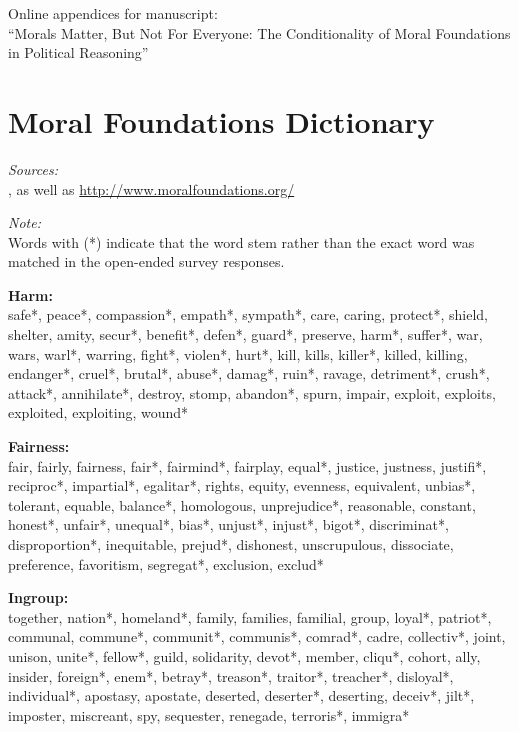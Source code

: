 \documentclass[12pt]{article}
\begin{document}
\clearpage\footnotesize\singlespacing
\setcounter{page}{1}
\appendices
\appendixpage
\renewcommand\thesubsection{\Roman{subsection}}
\begin{flushleft}
Online appendices for manuscript: \\
``Morals Matter, But Not For Everyone: The Conditionality of Moral Foundations in Political Reasoning''

\startcontents[sections]
\clearpage

\section{Moral Foundations Dictionary}\label{app:dict}
\textit{Sources:}\\
\citet{graham2009liberals}, as well as \url{http://www.moralfoundations.org/}
\vspace{.5cm}

\textit{Note:}\\
Words with (*) indicate that the word stem rather than the exact word was matched in the open-ended survey responses.
\vspace{.5cm}

\textbf{Harm:}\\
safe*, peace*, compassion*, empath*, sympath*, care, caring, protect*, shield, shelter, amity, secur*, benefit*, defen*, guard*, preserve, harm*, suffer*, war, wars, warl*, warring, fight*, violen*, hurt*, kill, kills, killer*, killed, killing, endanger*, cruel*, brutal*, abuse*, damag*, ruin*, ravage, detriment*, crush*, attack*, annihilate*, destroy, stomp, abandon*, spurn, impair, exploit, exploits, exploited, exploiting, wound*
\vspace{.5cm}

\textbf{Fairness:}\\
fair, fairly, fairness, fair*, fairmind*, fairplay, equal*, justice, justness, justifi*, reciproc*, impartial*, egalitar*, rights, equity, evenness, equivalent, unbias*, tolerant, equable, balance*, homologous, unprejudice*, reasonable, constant, honest*, unfair*, unequal*, bias*, unjust*, injust*, bigot*, discriminat*, disproportion*, inequitable, prejud*, dishonest, unscrupulous, dissociate, preference, favoritism, segregat*, exclusion, exclud*
\vspace{.5cm}

\textbf{Ingroup:}\\
together, nation*, homeland*, family, families, familial, group, loyal*, patriot*, communal, commune*, communit*, communis*, comrad*, cadre, collectiv*, joint, unison, unite*, fellow*, guild, solidarity, devot*, member, cliqu*, cohort, ally, insider, foreign*, enem*, betray*, treason*, traitor*, treacher*, disloyal*, individual*, apostasy, apostate, deserted, deserter*, deserting, deceiv*, jilt*, imposter, miscreant, spy, sequester, renegade, terroris*, immigra*
\vspace{.5cm}


\end{flushleft}
\end{document}
